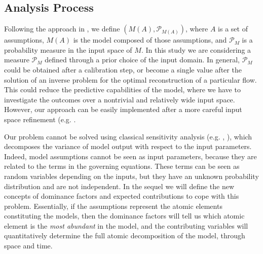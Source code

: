 \documentclass{article}
\begin{document}
\subsection{Analysis Process}
Following the approach in \cite{Patra2018b, Bevilacqua2019}, we define $\left(M(A),\mathcal P_{M(A)}\right)$, where $A$ is a set of assumptions, $M(A)$ is the model composed of those assumptions, and $\mathcal P_M$ is a probability measure in the input space of $M$. In this study we are considering a measure $\mathcal P_M$ defined through a prior choice of the input domain. In general, $\mathcal P_M$ could be obtained after a calibration step, or become a single value after the solution of an inverse problem for the optimal reconstruction of a particular flow. This could reduce the predictive capabilities of the model, where we have to investigate the outcomes over a nontrivial and relatively wide input space. However, our approach can be easily implemented after a more careful input space refinement (e.g. \cite{Bevilacqua2019}.

Our problem cannot be solved using classical sensitivity analysis (e.g. \cite{Saltelli2010}, \cite{Weirs2012}), which decomposes the variance of model output with respect to the input parameters. Indeed, model assumptions cannot be seen as input parameters, because they are related to the terms in the governing equations. These terms can be seen as random variables depending on the inputs, but they have an unknown probability distribution and are not independent. In the sequel we will define the new concepts of dominance factors and expected contributions to cope with this problem. %
Essentially, if the assumptions represent the atomic elements constituting the models, then the dominance factors will tell us which atomic element is the \emph{most abundant} in the model, and the contributing variables will quantitatively determine the full atomic decomposition of the model, through space and time.
\end{document}
